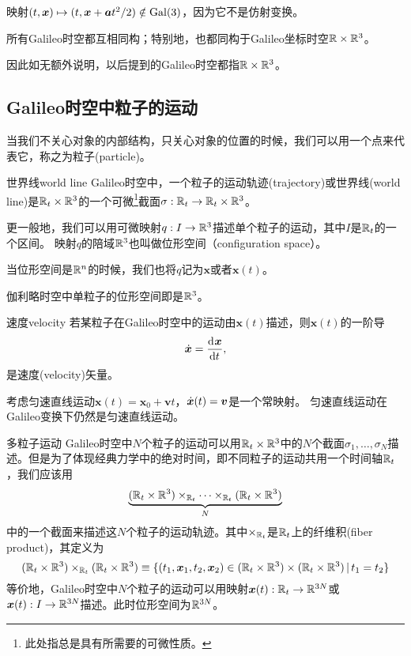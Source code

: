 \begin{example}{}{}
    映射$(t,\bm x)\mapsto(t,\bm x+\bm at^2/2)\notin\operatorname{Gal}(3)$，因为它不是仿射变换。
\end{example}
\begin{theorem}{}{}
    所有Galileo时空都互相同构；特别地，也都同构于Galileo坐标时空$\mathbb R\times\mathbb R^3$。
\end{theorem}
因此如无额外说明，以后提到的Galileo时空都指$\mathbb R\times\mathbb R^3$。

\subsection{Galileo时空中粒子的运动}
当我们不关心对象的内部结构，只关心对象的位置的时候，我们可以用一个点来代表它，称之为粒子(particle)。
\begin{definition}{世界线}{world line}
    Galileo时空中，一个粒子的运动轨迹(trajectory)或世界线(world line)是$\mathbb R_t\times\mathbb R^3$的一个可微\footnote{此处指总是具有所需要的可微性质。}截面$\sigma:\mathbb R_t\to\mathbb R_t\times\mathbb R^3$。

    更一般地，我们可以用可微映射$q:I\to\mathbb R^3$描述单个粒子的运动，其中$I$是$\mathbb R_t$的一个区间。
    映射$q$的陪域$\mathbb R^3$也叫做位形空间（configuration space）。

    当位形空间是$\mathbb R^n$的时候，我们也将$q$记为$\bm x$或者$\bm x(t)$。
\end{definition}
伽利略时空中单粒子的位形空间即是$\mathbb R^3$。
\begin{definition}{速度}{velocity}
    若某粒子在Galileo时空中的运动由$\bm x(t)$描述，则$\bm x(t)$的一阶导
    \begin{equation}
        \dot{\bm{x}}=\frac{\mathrm{d}^{{}}\bm x}{\mathrm{d}{t}^{{}}},
    \end{equation}
    是速度(velocity)矢量。
\end{definition}
\begin{example}{}{}
    考虑匀速直线运动$\bm x(t)=\bm x_0+\bm vt$，$\dot{\bm{x}}(t)=\bm v$是一个常映射。
    匀速直线运动在Galileo变换下仍然是匀速直线运动。
\end{example}

\begin{definition}{多粒子运动}{}
    Galileo时空中$N$个粒子的运动可以用$\mathbb R_t\times\mathbb R^3$中的$N$个截面$\sigma_1,\ldots,\sigma_N$描述。但是为了体现经典力学中的绝对时间，即不同粒子的运动共用一个时间轴$\mathbb R_t$，我们应该用
    \[
        \underbrace{(\mathbb R_t\times\mathbb R^3)\times_{\mathbb R_t}\cdots\times_{\mathbb R_t}(\mathbb R_t\times\mathbb R^3)}_N
    \]
    中的一个截面来描述这$N$个粒子的运动轨迹。其中$\times_{\mathbb R_t}$是$\mathbb R_t$上的纤维积(fiber product)，其定义为
    \begin{equation}
        (\mathbb R_t\times\mathbb R^3)\times_{\mathbb R_t}(\mathbb R_t\times\mathbb R^3)\equiv\{(t_1,\bm x_1,t_2,\bm x_2)\in(\mathbb R_t\times\mathbb R^3)\times(\mathbb R_t\times\mathbb R^3)\,|\,t_1=t_2\}
    \end{equation}
    等价地，Galileo时空中$N$个粒子的运动可以用映射$\bm x(t):\mathbb R_t\to\mathbb R^{3N}$或$\bm x(t):I\to\mathbb R^{3N}$描述。此时位形空间为$\mathbb R^{3N}$。
\end{definition}


